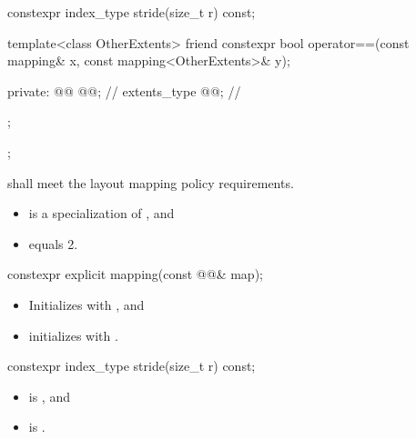 \begin{codeblock}
{{{      constexpr index_type stride(size_t r) const;

      template<class OtherExtents>
        friend constexpr bool operator==(const mapping& x, const mapping<OtherExtents>& y);

    private:
      @@ @@;                       // \expos
      extents_type @@;                                     // \expos
    };
  };
}
\end{codeblock}

\pnum
{} shall meet
the layout mapping policy requirements.

\pnum
\mandates
\begin{itemize}
\item
{} is a specialization of , and
\item
{} equals 2.
\end{itemize}

%
\begin{itemdecl}
constexpr explicit mapping(const @@& map);
\end{itemdecl}

\begin{itemdescr}
\pnum
\effects
\begin{itemize}
\item
Initializes  with , and
\item
initializes 
with .
\end{itemize}
\end{itemdescr}

%
\begin{itemdecl}
constexpr index_type stride(size_t r) const;
\end{itemdecl}

\begin{itemdescr}
\pnum
\expects
\begin{itemize}
\item
{} is , and
\item
{} is .
\end{itemize}

\pnum
\returns
{}
\end{itemdescr}

